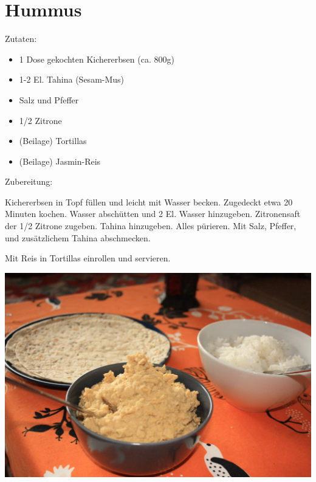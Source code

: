 \section{Hummus}
Zutaten:
\begin{itemize}
    \item 1 Dose gekochten Kichererbsen (ca. 800g)
    \item 1-2 El. Tahina (Sesam-Mus)
    \item Salz und Pfeffer
    \item 1/2 Zitrone
    \item (Beilage) Tortillas
    \item (Beilage) Jasmin-Reis
\end{itemize}


\noindent Zubereitung:

\noindent Kichererbsen in Topf füllen und leicht mit Wasser becken. Zugedeckt
etwa 20 Minuten kochen. Wasser abschütten und 2 El. Wasser hinzugeben.
Zitronensaft der 1/2 Zitrone zugeben. Tahina hinzugeben. Alles pürieren. Mit
Salz, Pfeffer, und zusätzlichem Tahina abschmecken.

Mit Reis in Tortillas einrollen und servieren.

\newpage
\mbox{}
\vfill
\begin{center}
    \includegraphics[width=\textwidth]{Hummus/IMG_6096._small.jpg}
\end{center}
\vfill
\mbox{ }
\newpage
